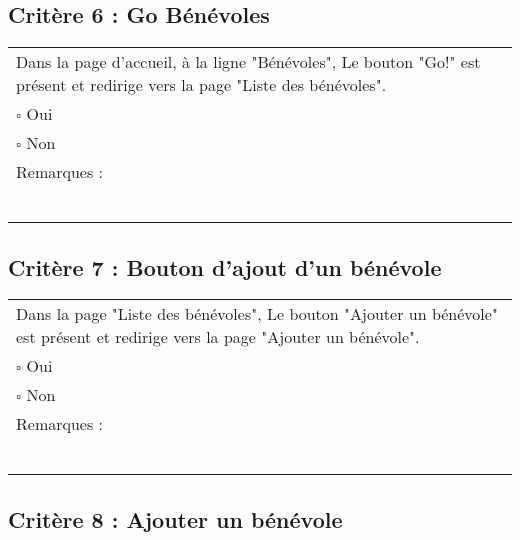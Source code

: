  		
  	\subsection*{Critère 6 : Go Bénévoles}
	
	\begin{center}
    	 		\begin{tabular}[h]{|p{}|}
			\hline
				Dans la page d'accueil, à la ligne "Bénévoles", Le bouton "Go!" est présent et redirige vers la page "Liste des bénévoles". \\
				$\square$ Oui  \\ $\square$ Non \\\hline Remarques : \\ ~\\
			 \\\hline
     		\end{tabular}
  		\end{center}	
  		
  		
  	\subsection*{Critère 7 : Bouton d'ajout d'un bénévole}
	
	\begin{center}
    	 		\begin{tabular}[h]{|p{}|}
			\hline
				Dans la page "Liste des bénévoles", Le bouton "Ajouter un bénévole" est présent et redirige vers la page "Ajouter un bénévole". \\
				$\square$ Oui  \\ $\square$ Non \\\hline Remarques : \\ ~\\
			 \\\hline
     		\end{tabular}
  		\end{center}	
  		
  		
  	\subsection*{Critère 8 : Ajouter un bénévole}
	

